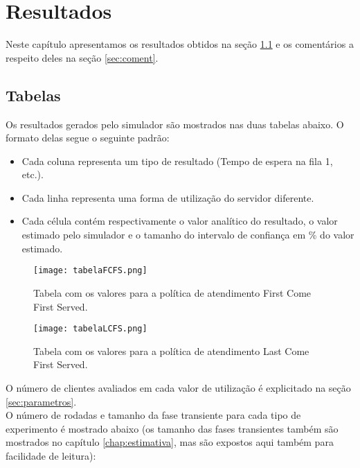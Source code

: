 \chapter{Resultados}

Neste capítulo apresentamos os resultados obtidos na seção \ref{sec:tabelas} e os comentários a respeito deles na seção \ref{sec:coment}.

\section{Tabelas}
\label{sec:tabelas}

Os resultados gerados pelo simulador são mostrados nas duas tabelas abaixo. O formato delas segue o seguinte padrão:\\
\begin{itemize}
  \item Cada coluna representa um tipo de resultado (Tempo de espera na fila 1, etc.).
  \item Cada linha representa uma forma de utilização do servidor diferente.
  \item Cada célula contém respectivamente o valor analítico do resultado, o valor estimado pelo simulador e o tamanho do intervalo de confiança em \% do valor estimado.
\end{itemize}
\pagebreak
\begin{figure}[htb!]
   \texttt{[image: tabelaFCFS.png]}
   \caption{Tabela com os valores para a política de atendimento First Come First Served.}
\end{figure}
\label{fig:tabfcfs}

\pagebreak
\begin{figure}[htb!]
   \texttt{[image: tabelaLCFS.png]}
   \caption{Tabela com os valores para a política de atendimento Last Come First Served.}
\end{figure}
\label{fig:tablcfs}

\pagebreak

O número de clientes avaliados em cada valor de utilização é explicitado na seção \ref{sec:parametros}.\\

O número de rodadas e tamanho da fase transiente para cada tipo de experimento é mostrado abaixo (os tamanho das fases transientes também são mostrados no capítulo \ref{chap:estimativa}, mas são expostos aqui também para facilidade de leitura):

